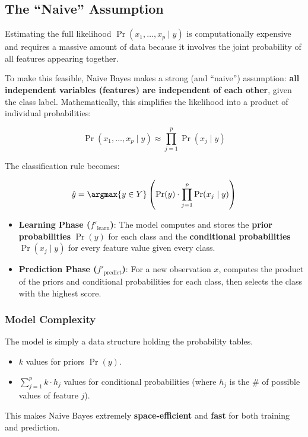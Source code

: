 \subsection{The ``Naive'' Assumption}

Estimating the full likelihood $\Pr(x_1, \dots, x_p \mid y)$ is computationally expensive and requires a massive amount of data because it involves the joint probability of all features appearing together.

To make this feasible, Naive Bayes makes a strong (and ``naive'') assumption: \textbf{all independent variables (features) are independent of each other}, given the class label.
Mathematically, this simplifies the likelihood into a product of individual probabilities:

$$
\Pr(x_1, \dots, x_p \mid y) \approx \prod_{j=1}^{p} \Pr(x_j \mid y)
$$

The classification rule becomes:

$$
\hat{y} = \argmax{y \in Y} \left( \Pr(y) \cdot \prod_{j=1}^{p} \Pr(x_j \mid y) \right)
$$

\begin{definitionblock}
    \begin{itemize}
        \item \textbf{Learning Phase ($f'_{\text{learn}}$)}: The model computes and stores the \textbf{prior probabilities} $\Pr(y)$ for each class and the \textbf{conditional probabilities} $\Pr(x_j \mid y)$ for every feature value given every class.
        \item \textbf{Prediction Phase ($f'_{\text{predict}}$)}: For a new observation $x$, computes the product of the priors and conditional probabilities for each class, then selects the class with the highest score.
    \end{itemize}
\end{definitionblock}

\subsubsection{Model Complexity}
The model is simply a data structure holding the probability tables.
\begin{itemize}
    \item $k$ values for priors $\Pr(y)$.
    \item $\sum_{j=1}^{p} k \cdot h_j$ values for conditional probabilities (where $h_j$ is the \# of possible values of feature $j$).
\end{itemize}
This makes Naive Bayes extremely \textbf{space-efficient} and \textbf{fast} for both training and prediction.

